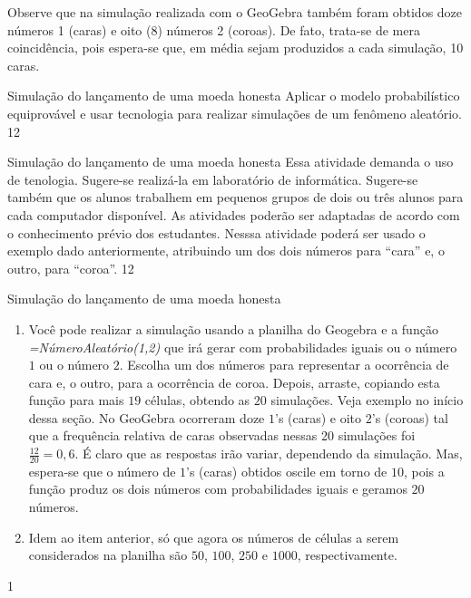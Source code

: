 Observe que na simulação realizada com o GeoGebra também foram obtidos doze números 1 (caras) e oito (8) números 2 (coroas). De fato, trata-se de mera coincidência, pois espera-se que, em média sejam produzidos a cada simulação, 10 caras.
\clearmargin
\begin{objectives}{Simulação do lançamento de uma moeda honesta}
{
Aplicar o modelo probabilístico equiprovável e usar tecnologia para realizar simulações de um fenômeno aleatório.
}{1}{2}
\end{objectives}
\begin{sugestions}{Simulação do lançamento de uma moeda honesta}
{
Essa atividade demanda o uso de tenologia. Sugere-se realizá-la em laboratório de informática. Sugere-se também que os alunos trabalhem em pequenos grupos de dois ou três alunos para cada computador disponível. As atividades poderão ser adaptadas de acordo com o conhecimento prévio dos estudantes. Nesssa atividade poderá ser usado o exemplo dado anteriormente, atribuindo um dos dois números para “cara”{} e, o outro, para “coroa”.
}{1}{2}
\end{sugestions}
\begin{answer}{Simulação do lançamento de uma moeda honesta}
{
\begin{enumerate}
\item Você pode realizar a simulação usando a planilha do Geogebra e a função \textit{=NúmeroAleatório(1,2)} que irá gerar com probabilidades iguais ou o número $1$ ou o número $2$. Escolha um dos números para representar a ocorrência de cara e, o outro, para a ocorrência de coroa. Depois, arraste, copiando esta função para mais $19$ células, obtendo as $20$ simulações. Veja exemplo no início dessa seção. No GeoGebra ocorreram doze $1$’s (caras) e oito $2$’s (coroas) tal que a frequência relativa de caras observadas nessas 20 simulações foi $\frac{12}{20}=0{,}6$. É claro que as respostas irão variar, dependendo da simulação. Mas, espera-se que o número de $1$’s (caras) obtidos oscile em torno de $10$, pois a função produz os dois números com probabilidades iguais e geramos $20$ números.

\item Idem ao item anterior, só que agora os números de células a serem considerados na planilha são $50$, $100$, $250$ e $1000$, respectivamente.
\end{enumerate}
}{1}
\end{answer}
